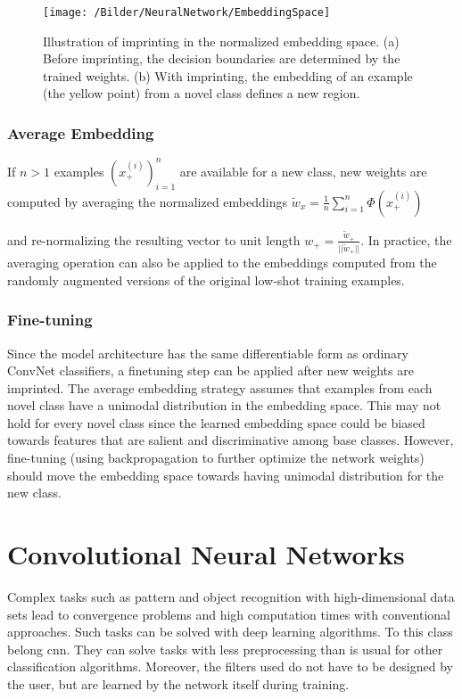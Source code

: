 \begin{figure}[!h]
	\label{fig: EmbSpace}
	\centering
	\texttt{[image: /Bilder/NeuralNetwork/EmbeddingSpace]}
	\caption{Illustration of imprinting in the normalized embedding
		space. (a) Before imprinting, the decision boundaries are determined by the trained weights. (b) With imprinting, the embedding
		of an example (the yellow point) from a novel class defines a new
		region. \cite{qi:2018}}
\end{figure}

\subsubsection{Average Embedding}
 If $n > 1$ examples $(x_{+}^{(i)})_{i=1}^{n}$ are
available for a new class, new weights are computed by averaging the normalized embeddings $\tilde{w}_{x} = \frac{1}{n}\sum_{i=1}^{n}\Phi(x_{+}^{(i)})$

and re-normalizing the resulting vector to unit length $w_{+} =
\frac{\tilde{w}_{+}}{||\tilde{w}_{+}||}$. In practice, the averaging operation can also
be applied to the embeddings computed from the randomly
augmented versions of the original low-shot training examples.

\subsubsection{Fine-tuning} 
Since the model architecture has the same
differentiable form as ordinary ConvNet classifiers, a finetuning step can be applied after new weights are imprinted.
The average embedding strategy assumes that examples
from each novel class have a unimodal distribution in the
embedding space. This may not hold for every novel class
since the learned embedding space could be biased towards features that are salient and discriminative among
base classes. However, fine-tuning (using backpropagation
to further optimize the network weights) should move the
embedding space towards having unimodal distribution for
the new class. \cite{qi:2018}



\section{Convolutional Neural Networks}

Complex tasks such as pattern and object recognition with high-dimensional data sets lead to convergence problems and high computation times with conventional approaches. Such tasks can be solved with deep learning algorithms. To this class belong \ac{cnn}. They can solve tasks with less preprocessing than is usual for other classification algorithms. Moreover, the filters used do not have to be designed by the user, but are learned by the network itself during training. \cite{Saha:2018}

